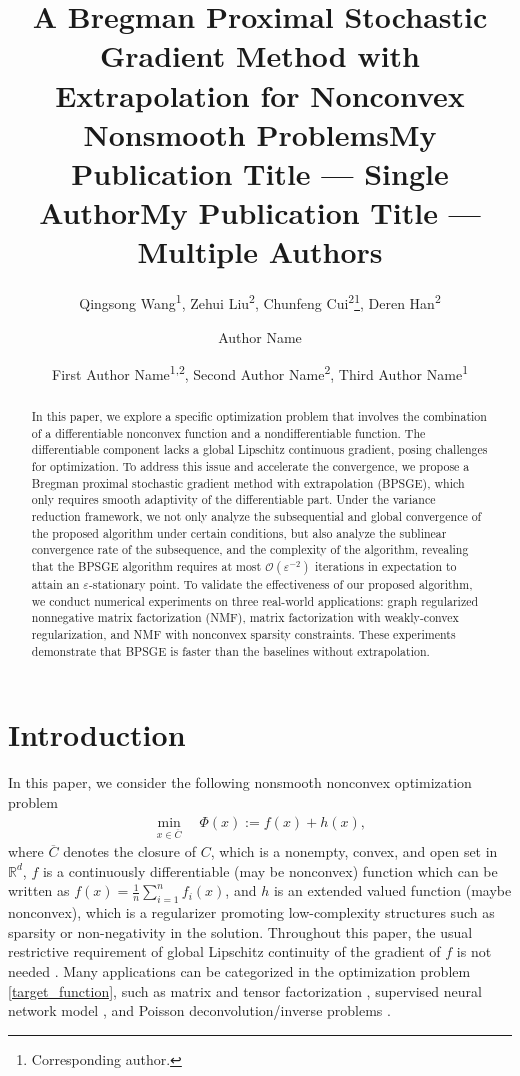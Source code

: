 \documentclass[letterpaper]{article} %
\title{A Bregman Proximal Stochastic Gradient Method with Extrapolation for Nonconvex Nonsmooth Problems}
\author{
	Qingsong Wang\textsuperscript{\rm 1},
	Zehui Liu\textsuperscript{\rm 2},
	Chunfeng Cui\textsuperscript{\rm 2}\thanks{Corresponding author.},
	Deren Han\textsuperscript{\rm 2}
}
\title{My Publication Title --- Single Author}
\author {
	Author Name
}
\title{My Publication Title --- Multiple Authors}
\author {
	First Author Name\textsuperscript{\rm 1,\rm 2},
	Second Author Name\textsuperscript{\rm 2},
	Third Author Name\textsuperscript{\rm 1}
}
\begin{document}
	\maketitle

	\begin{abstract}
		In this paper, we explore a specific optimization problem that involves the combination of a differentiable nonconvex function and a nondifferentiable function. The differentiable component lacks a global Lipschitz continuous gradient, posing challenges for optimization.  To address this issue and accelerate the convergence, we propose a Bregman proximal stochastic gradient method with extrapolation (BPSGE), which only requires smooth adaptivity of the differentiable part.  Under the variance reduction framework, we not only analyze the subsequential and global convergence of the proposed algorithm under certain conditions,  but also analyze the sublinear convergence rate of the subsequence, and the complexity of the algorithm, revealing that the BPSGE algorithm requires at most  $\mathcal{O}(\varepsilon^{-2})$ iterations in expectation to attain an $\varepsilon$-stationary point.  To validate the effectiveness of our proposed algorithm, we conduct numerical experiments on three real-world applications: graph regularized nonnegative matrix factorization (NMF), matrix factorization with weakly-convex regularization, and NMF with nonconvex sparsity constraints. These experiments demonstrate that BPSGE is faster than the baselines without extrapolation.
	\end{abstract}

	\section{Introduction}
	In this paper, we  consider the following nonsmooth nonconvex optimization problem
	\begin{eqnarray}
		\min_{x\in \overline{C}}\quad \Phi(x):=f(x)+h(x), \label{target_function}
	\end{eqnarray}
	where $\overline{C}$ denotes the closure of $C$, which is a nonempty, convex, and open set in $\mathbb{R}^{d}$, $f$ is a continuously differentiable  (may be nonconvex) function which can be written as $f(x)=\frac{1}{n}\sum_{i=1}^{n}f_{i}(x)$, and $h$ is an extended valued function (maybe nonconvex), which is a regularizer promoting low-complexity structures such as sparsity \cite{Donoho95, FanL01, Zhang10} or non-negativity \cite{LeeS99, HeXZZC11} in the solution. Throughout this paper, the usual restrictive requirement of global Lipschitz continuity of the gradient of $f$ is not needed  \cite{Lan2020First, Gillis20}. Many applications can be categorized in the optimization problem \eqref{target_function}, such as matrix and tensor factorization \cite{ComonGLM08, KoldaB09, CheW20}, supervised neural network model \cite{HasannasabHNPSS2020},  and Poisson deconvolution/inverse problems \cite{BolteSTV18First}.
\end{document}
